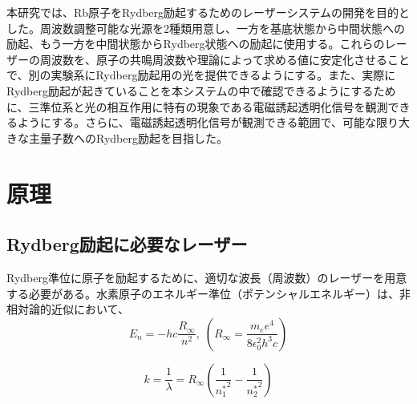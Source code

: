 \documentclass[dvipdfmx]{jsreport}
\begin{document}
本研究では、Rb原子をRydberg励起するためのレーザーシステムの開発を目的とした。周波数調整可能な光源を2種類用意し、一方を基底状態から中間状態への励起、もう一方を中間状態からRydberg状態への励起に使用する。これらのレーザーの周波数を、原子の共鳴周波数や理論によって求める値に安定化させることで、別の実験系にRydberg励起用の光を提供できるようにする。また、実際にRydberg励起が起きていることを本システムの中で確認できるようにするために、三準位系と光の相互作用に特有の現象である電磁誘起透明化信号を観測できるようにする。さらに、電磁誘起透明化信号が観測できる範囲で、可能な限り大きな主量子数へのRydberg励起を目指した。

\clearpage
\chapter{原理}
\section{Rydberg励起に必要なレーザー}
\label{sec:rydberg}
Rydberg準位に原子を励起するために、適切な波長（周波数）のレーザーを用意する必要がある。水素原子のエネルギー準位（ポテンシャルエネルギー）は、非相対論的近似において、
\begin{equation}
\label{rydberg}
 E_n = -hc\frac{R_{\infty}}{n^2},\; \left(R_{\infty} = \frac{m_e e^4}{8 \epsilon_0^2 h^3 c} \right)
\end{equation}

\begin{equation}
 k = \frac{1}{\lambda} = R_{\infty}\left( \frac{1}{{n_1^*}^2} - \frac{1}{{n_2^*}^2} \right)
\end{equation}
\end{document}
